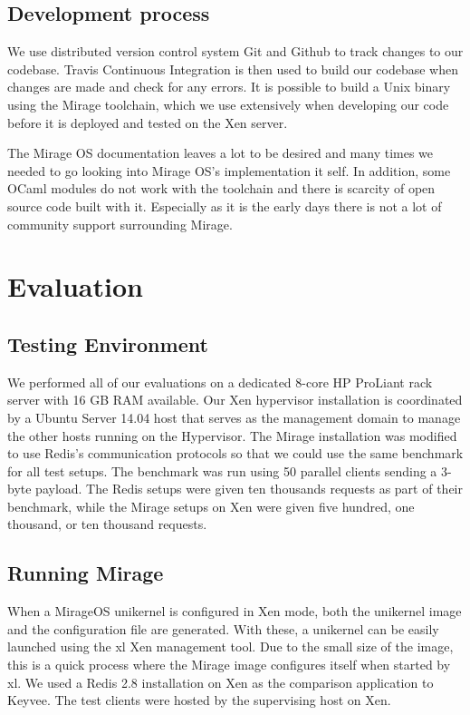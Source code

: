 \documentclass[english,10pt,twocolumn]{article}
\begin{document}
\subsection{Development process}

We use distributed version control system Git and Github to track changes to our codebase.
Travis Continuous Integration is then used to build our codebase when changes are made and check for any errors.
It is possible to build a Unix binary using the Mirage toolchain, which we use extensively when developing our code before it is deployed and tested on the Xen server.

The Mirage OS documentation leaves a lot to be desired and many times we needed to go looking into Mirage OS's implementation it self.
In addition, some OCaml modules do not work with the toolchain and there is scarcity of open source code built with it.
Especially as it is the early days there is not a lot of community support surrounding Mirage.


\section{Evaluation}
\subsection{Testing Environment}
We performed all of our evaluations on a dedicated 8-core HP ProLiant rack server with 16 GB RAM available.
Our Xen hypervisor installation is coordinated by a Ubuntu Server 14.04 host that serves as the management domain to manage the other hosts running on the Hypervisor.
The Mirage installation was modified to use Redis's communication protocols so that we could use the same benchmark for all test setups. The benchmark was run using 50 parallel clients sending a 3-byte payload.
The Redis setups were given ten thousands requests as part of their benchmark, while the Mirage setups on Xen were given five hundred, one thousand, or ten thousand requests.

\subsection{Running Mirage}


When a MirageOS unikernel is configured in Xen mode, both the unikernel image and the configuration file are generated.
With these, a unikernel can be easily launched using the xl Xen management tool.
Due to the small size of the image, this is a quick process where the Mirage image configures itself when started by xl.
We used a Redis 2.8 installation on Xen as the comparison application to Keyvee.
The test clients were hosted by the supervising host on Xen.
\end{document}
